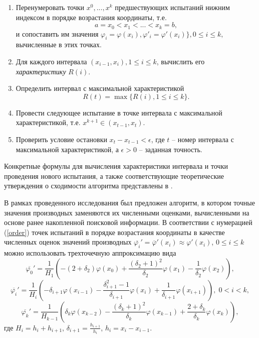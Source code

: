 \documentclass[11pt, oneside, a4paper]{article}
\begin{document}
\begin{enumerate}
	\item Перенумеровать точки $x^0,...,x^k$ предшествующих испытаний нижним индексом в порядке возрастания координаты, т.е.
	\begin{equation}\label{order}
		a=x_0<x_1<...<x_k=b,
	\end{equation}
	и сопоставить им значения $ \varphi_i=\varphi (x_i), \varphi'_i=\varphi'(x_i)\}, 0 \leq i \leq k,$ вычисленные в этих точках.
	\item Для каждого интервала $(x_{i-1},x_i), 1\leq i\leq k$, вычислить его \textit{характеристику} $R(i)$.
	\item Определить интервал с максимальной характеристикой 
	\[
	R(t)=\max\{R(i), 1\leq i \leq k\}.
	\]
	\item Провести следующее испытание в точке интервала с максимальной характеристикой, т.е. $x^{k+1}\in(x_{t-1},x_t).$
	\item Проверить условие остановки $x_t-x_{t-1}<\epsilon$, где $t$ -- номер интервала с максимальной характеристикой, а $\epsilon > 0$ -- заданная точность. 
	\end{enumerate}
	
	Конкретные формулы для вычисления характеристики интервала и точки проведения нового испытания, а также соответствующие теоретические утверждения о сходимости алгоритма представлены в \cite{Gergel96}.


В рамках проведенного исследования был предложен алгоритм, в котором точные значения производных заменяются их численными оценками, вычисленными на основе ранее накопленной поисковой информации. 
В соответствии с нумерацией (\ref{order}) точек испытаний в порядке возрастания координаты в качестве численных оценок значений производных $\overline{\varphi_i}' = \overline{\varphi}'(x_i) \approx \varphi'(x_i)$, $0\leq i\leq k$ можно использовать трехточечную аппроксимацию вида
\[
\overline{\varphi_0}' = \frac{1}{H_1}\left(-(2+\delta_{2})\varphi(x_{0}) + \frac{(\delta_{2}+1)^2}{\delta_{2}}\varphi(x_1) - \frac{1}{\delta_{2}}\varphi(x_{2}) \right),
\]
\begin{equation}\label{numer}
\overline{\varphi_i}' = \frac{1}{H_i}\left(-\delta_{i+1}\varphi(x_{i-1}) - \frac{\delta_{i+1}^2-1}{\delta_{i+1}}\varphi(x_i) + \frac{1}{\delta_{i+1}}\varphi(x_{i+1}) \right), \; 0<i<k,
\end{equation}
\[
\overline{\varphi_k}' = \frac{1}{H_{k-1}}\left(\delta_{k}\varphi(x_{k-2}) - \frac{(\delta_{k}+1)^2}{\delta_{k}}\varphi(x_{k-1}) + \frac{2+\delta_k}{\delta_{k}}\varphi(x_k) \right),
\]
где $H_i=h_i+h_{i+1}$, $\delta_{i+1}=\frac{h_{i+1}}{h_i}$, $h_i=x_i-x_{i-1}$.
\end{document}
